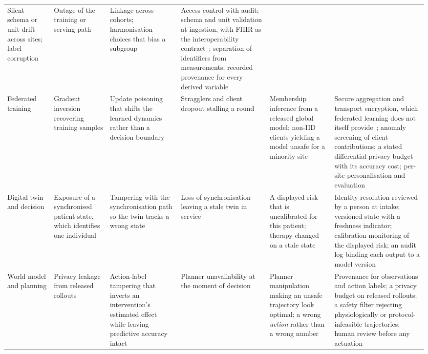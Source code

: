 \documentclass[journal]{IEEEtran}
\begin{document}
\begin{table}[tbp]
\begin{tabularx}{\textwidth}{L{1.9cm} L{2.6cm} L{2.4cm} L{2.2cm} L{2.4cm} X}
Silent schema or unit drift across sites; label corruption &
Outage of the training or serving path &
Linkage across cohorts; harmonisation choices that bias a subgroup &
Access control with audit; schema and unit validation at ingestion, with FHIR as the interoperability contract~\cite{ayaz2021fhir}; separation of identifiers from measurements; recorded provenance for every derived variable \\
\addlinespace[2pt]
Federated training &
Gradient inversion recovering training samples &
Update poisoning that shifts the learned dynamics rather than a decision boundary &
Stragglers and client dropout stalling a round &
Membership inference from a released global model; non-IID clients yielding a model unsafe for a minority site &
Secure aggregation and transport encryption, which federated learning does not itself provide~\cite{nguyen2022FLsmarthealthcare,aouedi2022FLmedical}; anomaly screening of client contributions; a stated differential-privacy budget with its accuracy cost; per-site personalisation and evaluation \\
\addlinespace[2pt]
Digital twin and decision &
Exposure of a synchronised patient state, which identifies one individual &
Tampering with the synchronisation path so the twin tracks a wrong state &
Loss of synchronisation leaving a stale twin in service &
A displayed risk that is uncalibrated for this patient; therapy changed on a stale state &
Identity resolution reviewed by a person at intake; versioned state with a freshness indicator; calibration monitoring of the displayed risk; an audit log binding each output to a model version~\cite{Sel2025VVUQ} \\
\addlinespace[2pt]
World model and planning &
Privacy leakage from released rollouts &
Action-label tampering that inverts an intervention's estimated effect while leaving predictive accuracy intact &
Planner unavailability at the moment of decision &
Planner manipulation making an unsafe trajectory look optimal; a wrong \emph{action} rather than a wrong number &
Provenance for observations and action labels; a privacy budget on released rollouts; a safety filter rejecting physiologically or protocol-infeasible trajectories; human review before any actuation~\cite{maes2026leworldmodel} \\
\bottomrule
\end{tabularx}
\end{table}
\end{document}
